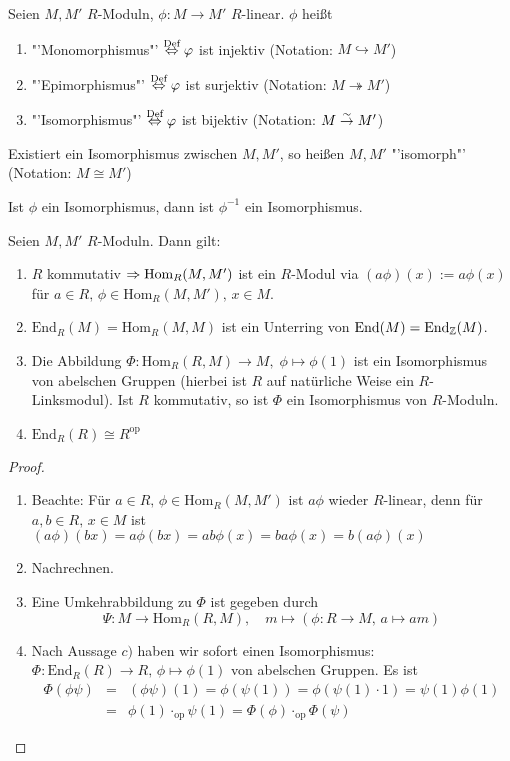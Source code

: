 \begin{df}
	Seien $M,M'$ $R$-Moduln, $\phi:M\to M'$ $R$-linear. $\phi$ heißt 
	\begin{enumerate}
		\item[] "'Monomorphismus"' $\overset{\text{Def}}{\Leftrightarrow} \varphi$ ist injektiv (Notation: $M \hookrightarrow M'$)
		\item[] "'Epimorphismus"' $\overset{\text{Def}}{\Leftrightarrow} \varphi$ ist surjektiv (Notation: $M \twoheadrightarrow M'$)
		\item[] "'Isomorphismus"' $\overset{\text{Def}}{\Leftrightarrow} \varphi$ ist bijektiv (Notation: $M \overset{\sim}{\rightarrow} M'$)
	\end{enumerate}
	Existiert ein Isomorphismus zwischen $M,M'$, so heißen $M,M'$ "'isomorph"' (Notation: $M \cong M'$)
\end{df}
\begin{anm}
	Ist $\phi$ ein Isomorphismus, dann ist $\phi^{-1}$ ein Isomorphismus.
\end{anm}
\begin{bem}
	Seien $M,M'$ $R$-Moduln. Dann gilt:
	\begin{enumerate}[label=\alph*)]
		\item $R$ kommutativ $\Rightarrow \text{Hom}_R(M, M')$ ist ein $R$-Modul via $(a \phi)(x):= a\phi(x)$ für $a\in R, \, \phi \in \text{Hom}_R(M, M'), \, x\in M$.
		\item $\text{End}_R(M) = \text{Hom}_R(M, M)$ ist ein Unterring von $\text{End}(M) = \text{End}_{\mathbb{Z}}(M)$.
		\item Die Abbildung $\Phi:\text{Hom}_R(R, M)\to M, \; \phi \mapsto \phi(1)$ ist ein Isomorphismus von abelschen Gruppen (hierbei ist $R$ auf natürliche Weise ein $R$-Linksmodul). Ist $R$ kommutativ, so ist $\Phi$ ein Isomorphismus von $R$-Moduln.
		\item $\text{End}_R(R)\cong R^\text{op}$
	\end{enumerate}
\end{bem}
\begin{proof}
	\begin{enumerate}[label=\alph*)]
		\item Beachte: Für $a\in R, \, \phi\in \text{Hom}_R(M, M')$ ist $a\phi$ wieder $R$-linear, denn für $a,b\in R, \, x\in M$ ist $(a\phi)(bx) = a\phi(bx) = ab \phi(x) = ba \phi(x) = b (a\phi)(x)$
		\item Nachrechnen.
		\item Eine Umkehrabbildung zu $\Phi$ ist gegeben durch 
		$$\Psi:M \to \text{Hom}_R(R, M), \quad m \mapsto(\phi:R\to M, \, a \mapsto am)$$
		\item Nach Aussage $c)$ haben wir sofort einen Isomorphismus: $\Phi:\text{End}_R(R) \to R, \, \phi\mapsto \phi(1)$ von abelschen Gruppen. Es ist 
		\begin{eqnarray*}\Phi(\phi \psi) &=& (\phi \psi)(1) = \phi(\psi(1)) = \phi( \psi(1) \cdot 1) = \psi(1) \phi(1)\\
		&=& \phi(1) \cdot_{\text{op}}  \psi(1) = \Phi(\phi) \cdot_\text{op} \Phi(\psi)
		\end{eqnarray*}
	\end{enumerate}
\end{proof}
